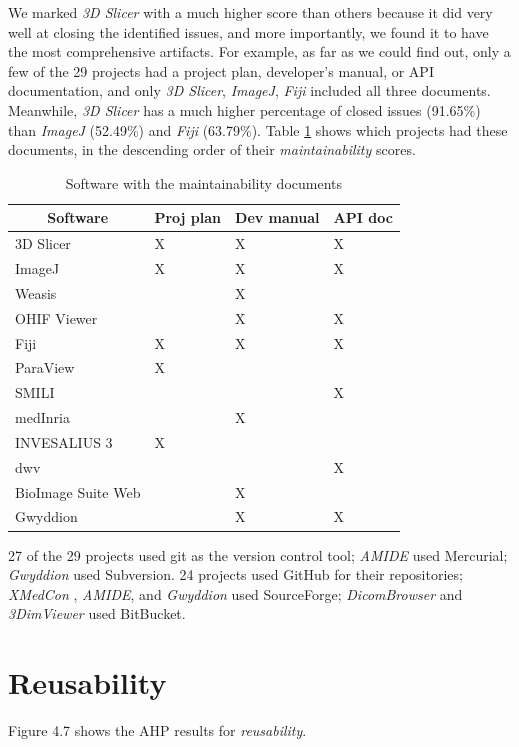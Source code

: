 We marked \textit{3D Slicer} with a much higher score than others because it did very well at closing the identified issues, and more importantly, we found it to have the most comprehensive artifacts. For example, as far as we could find out, only a few of the 29 projects had a project plan, developer's manual, or API documentation, and only \textit{3D Slicer}, \textit{ImageJ}, \textit{Fiji} included all three documents. Meanwhile, \textit{3D Slicer} has a much higher percentage of closed issues (91.65\%) than \textit{ImageJ} (52.49\%) and \textit{Fiji} (63.79\%). Table \ref{tab_maintainability_docs} shows which projects had these documents, in the descending order of their \textit{maintainability} scores.

\begin{table}[H]
\centering
\begin{tabular}{llll}
\hline
\multicolumn{1}{c}{Software} & Proj plan & Dev manual & API doc \\ \hline
3D Slicer & X & X & X \\
ImageJ & X & X & X \\
Weasis &  & X &  \\
OHIF Viewer &  & X & X \\
Fiji & X & X & X \\
ParaView & X &  &  \\
SMILI &  &  & X \\
medInria &  & X &  \\
INVESALIUS 3 & X &  &  \\
dwv &  &  & X \\
BioImage Suite Web &  & X &  \\
Gwyddion &  & X & X \\ \hline
\end{tabular}
\caption{\label{tab_maintainability_docs}Software with the maintainability documents}
\end{table}

27 of the 29 projects used git as the version control tool; \textit{AMIDE} used Mercurial; \textit{Gwyddion} used Subversion. 24 projects used GitHub for their repositories; \textit{XMedCon
}, \textit{AMIDE}, and \textit{Gwyddion} used SourceForge; \textit{DicomBrowser} and \textit{3DimViewer} used BitBucket.

\section{Reusability}
\label{sec_result_reusability}
Figure 4.7 shows the AHP results for \textit{reusability}.

